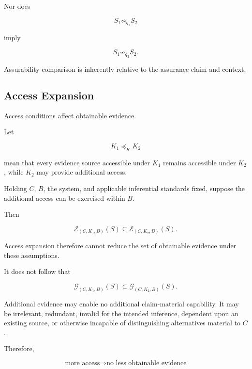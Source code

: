 Nor does

\begin{equation}
  S_1\not\sim_{q_1}S_2
\end{equation}

imply

\begin{equation}
  S_1\not\sim_{q_2}S_2.
\end{equation}

Assurability comparison is inherently relative to the assurance claim and context.

\subsection{Access Expansion}
\label{aa.subsec.access-monotonicity}

Access conditions affect obtainable evidence.

Let

\begin{equation}
  K_1
  \preceq_K
  K_2
\end{equation}

mean that every evidence source accessible under \(K_1\) remains accessible under \(K_2\), while \(K_2\) may provide additional access.

Holding \(C\), \(B\), the system, and applicable inferential standards fixed,
suppose the additional access can be exercised within \(B\).

Then

\begin{equation}
  \mathcal{E}_{(C,K_1,B)}(S)
  \subseteq
  \mathcal{E}_{(C,K_2,B)}(S).
  \label{eq:access-evidence-monotonicity}
\end{equation}

Access expansion therefore cannot reduce the set of obtainable evidence under these assumptions.

It does not follow that

\begin{equation}
  \mathcal{G}_{(C,K_1,B)}(S)
  \subset
  \mathcal{G}_{(C,K_2,B)}(S).
\end{equation}

Additional evidence may enable no additional claim-material capability.
It may be irrelevant, redundant, invalid for the intended inference,
dependent upon an existing source, or otherwise incapable of distinguishing alternatives material to \(C\).

Therefore,

\begin{equation}
  \boxed{
    \text{more access}
    \Rightarrow
    \text{no less obtainable evidence}
  }
\end{equation}

